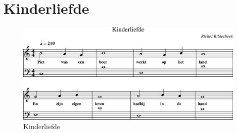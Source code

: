 \section{Kinderliefde}



\begin{figure}[!htbp]
  \includegraphics[width=\textwidth,height=\textheight,keepaspectratio]{../songs/07_kinderliefde.png}
  \caption{Kinderliefde}
  \label{fig:07_kinderliefde}
\end{figure}
